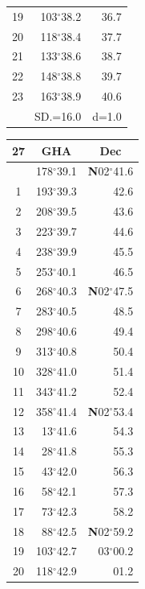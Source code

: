 \documentclass[10pt, a4paper]{report}
\begin{document}
\begin{scriptsize}
\begin{tabular*}{0.2\textwidth}[t]{@{\extracolsep{\fill}}|c|rr|}
19 & 103$^\circ$38.2 & 36.7\\
20 & 118$^\circ$38.4 & 37.7\\
21 & 133$^\circ$38.6 & \raisebox{0.24ex}{\boldmath$\cdot$~\boldmath$\cdot$~~}38.7\\
22 & 148$^\circ$38.8 & 39.7\\
23 & 163$^\circ$38.9 & 40.6\\
\hline
\rule{0pt}{2.4ex} & \multicolumn{1}{c}{SD.=16.0} & \multicolumn{1}{c|}{d=1.0}\\
\hline
\end{tabular*}\noindent
\begin{tabular*}{0.2\textwidth}[t]{@{\extracolsep{\fill}}|c|rr|}
\hline
\multicolumn{1}{|c|}{\rule{0pt}{2.6ex}\textbf{27}} & \multicolumn{1}{c}{\textbf{GHA}} & \multicolumn{1}{c|}{\textbf{Dec}}\\
\hline\rule{0pt}{2.6ex}\noindent
0 & 178$^\circ$39.1 & \textbf{N}02$^\circ$41.6\\
1 & 193$^\circ$39.3 & 42.6\\
2 & 208$^\circ$39.5 & 43.6\\
3 & 223$^\circ$39.7 & \raisebox{0.24ex}{\boldmath$\cdot$~\boldmath$\cdot$~~}44.6\\
4 & 238$^\circ$39.9 & 45.5\\
5 & 253$^\circ$40.1 & 46.5\\[2Pt]
6 & 268$^\circ$40.3 & \textbf{N}02$^\circ$47.5\\
7 & 283$^\circ$40.5 & 48.5\\
8 & 298$^\circ$40.6 & 49.4\\
9 & 313$^\circ$40.8 & \raisebox{0.24ex}{\boldmath$\cdot$~\boldmath$\cdot$~~}50.4\\
10 & 328$^\circ$41.0 & 51.4\\
11 & 343$^\circ$41.2 & 52.4\\[2Pt]
12 & 358$^\circ$41.4 & \textbf{N}02$^\circ$53.4\\
13 & 13$^\circ$41.6 & 54.3\\
14 & 28$^\circ$41.8 & 55.3\\
15 & 43$^\circ$42.0 & \raisebox{0.24ex}{\boldmath$\cdot$~\boldmath$\cdot$~~}56.3\\
16 & 58$^\circ$42.1 & 57.3\\
17 & 73$^\circ$42.3 & 58.2\\[2Pt]
18 & 88$^\circ$42.5 & \textbf{N}02$^\circ$59.2\\
19 & 103$^\circ$42.7 & 03$^\circ$00.2\\
20 & 118$^\circ$42.9 & 01.2\\

\end{tabular*}
\end{scriptsize}
\end{document}
